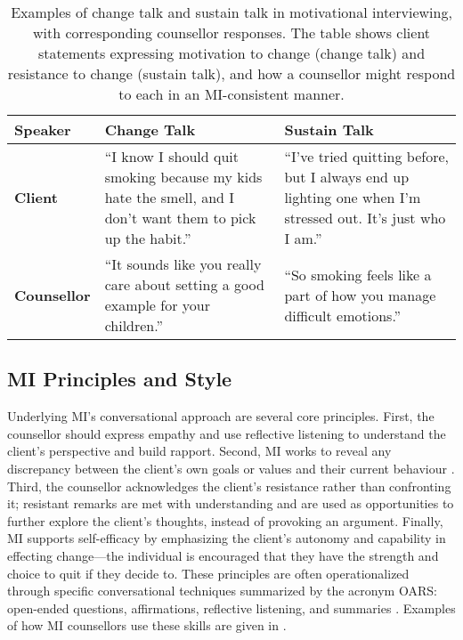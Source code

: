 \begin{table}[ht!]
\centering
\begin{tabular}{@{} p{} p{} p{} @{}}
\toprule
\textbf{Speaker} & \textbf{Change Talk} & \textbf{Sustain Talk} \\
\midrule
\textbf{Client} & 
``I know I should quit smoking because my kids hate the smell, and I don’t want them to pick up the habit.'' & 
``I’ve tried quitting before, but I always end up lighting one when I’m stressed out. It’s just who I am.'' \\
\addlinespace
\textbf{Counsellor} & 
``It sounds like you really care about setting a good example for your children.'' & 
``So smoking feels like a part of how you manage difficult emotions.'' \\
\bottomrule
\end{tabular}
\caption[Examples of change talk and sustain talk]{Examples of change talk and sustain talk in motivational interviewing, with corresponding counsellor responses. The table shows client statements expressing motivation to change (change talk) and resistance to change (sustain talk), and how a counsellor might respond to each in an MI-consistent manner.}
\label{tab:change_sustain_talk}
\end{table}



\subsection*{MI Principles and Style}
Underlying MI’s conversational approach are several core principles. First, the counsellor should express empathy and use reflective listening to understand the client's perspective and build rapport. Second, MI works to reveal any discrepancy between the client’s own goals or values and their current behaviour \cite{Miller_2023}. Third, the counsellor acknowledges the client’s resistance rather than confronting it; resistant remarks are met with understanding and are used as opportunities to further explore the client’s thoughts, instead of provoking an argument. Finally, MI supports self-efficacy by emphasizing the client’s autonomy and capability in effecting change—the individual is encouraged that they have the strength and choice to quit if they decide to. These principles are often operationalized through specific conversational techniques summarized by the acronym OARS: open-ended questions, affirmations, reflective listening, and summaries \cite{Rollnick1995}. Examples of how MI counsellors use these skills are given in .


